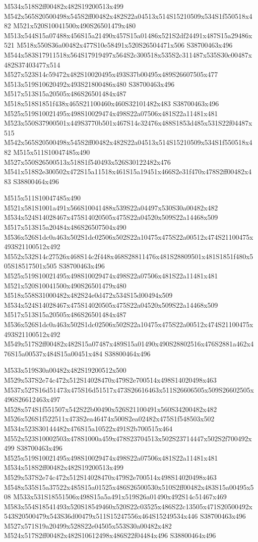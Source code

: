 \documentclass{article}
\begin{document}
\begin{multicols}{2}
M534x518S2ff00482x482S19200513x499 M542x565S20500498x545S2ff00482x482S22a04513x514S15210509x534S1f550518x482 M521x520S10041500x490S26501479x480 M513x544S15a07488x456S15a21490x457S15a01486x521S2df24491x487S15a29486x521 M518x550S36a00482x477S10e58491x520S26504471x506 S38700463x496 M544x583S17911518x564S17919497x564S2c300518x535S2c311487x535S30c00487x482S37403477x514 M527x523S14c59472x482S10020495x493S37b00495x489S26607505x477 M513x519S10620492x493S21800486x480 S38700463x496 M517x513S15a20505x486S26501484x487 M518x518S1851f438x465S21100460x460S32101482x483 S38700463x496 M525x519S10021495x498S10029474x498S22a07506x481S22a11481x481 M523x550S37900501x449S3770b501x467S14c32476x488S1853d485x531S22f04487x515 M542x565S20500498x545S2ff00482x482S22a04513x514S15210509x534S1f550518x482 M515x511S10047485x490 M527x550S26500513x518S1f540493x526S30122482x476 M541x518S2e300502x472S15a11518x461S15a19451x466S2e31f470x478S2ff00482x483 S38800464x496

M515x511S10047485x490 M521x581S1001a491x566S10041488x539S22a04497x530S30a00482x482 M534x524S14028467x475S14020505x475S22a04520x509S22a14468x509 M517x513S15a20484x486S26507504x490 M536x526S1dc0a463x502S1dc02506x502S22a10475x475S22a00512x474S21100475x493S21100512x492 M552x532S14c27526x468S14c2f448x468S28811476x481S28809501x481S1851f480x505S18517501x505 S38700463x496 M525x519S10021495x498S10029474x498S22a07506x481S22a11481x481 M521x520S10041500x490S26501479x480 M518x558S31000482x482S24e0d472x534S15d00494x509 M534x524S14028467x475S14020505x475S22a04520x509S22a14468x509 M517x513S15a20505x486S26501484x487 M536x526S1dc0a463x502S1dc02506x502S22a10475x475S22a00512x474S21100475x493S21100512x492 M549x517S2ff00482x482S15a07487x489S15a01490x490S28802516x476S2881a462x476S15a00537x484S15a00451x484 S38800464x496

M533x519S30a00482x482S19200512x500 M529x537S2e74c472x512S14028470x479S2e700514x498S14020498x463 M537x527S16d51473x475S16d51517x473S26616463x511S26606505x509S26602505x496S26612463x497 M528x574S1f551507x542S22b00490x526S21100491x560S34200482x482 M526x526S1f522511x473S2ea46474x500S2ea02482x475S1f548503x502 M534x523S30144482x476S15a10522x491S2b700515x464 M552x523S10002503x478S1000a459x478S23704513x502S23714447x502S2f700492x499 S38700463x496 M525x519S10021495x498S10029474x498S22a07506x481S22a11481x481 M534x518S2ff00482x482S19200513x499 M529x537S2e74c472x512S14028470x479S2e700514x498S14020498x463 M548x535S15a37522x485S15a01525x486S26500530x510S2ff00482x483S15a00495x508 M533x531S18551506x498S15a5a491x519S26a01490x492S14c51467x469 M583x554S18541493x520S18549460x520S22c03525x486S22c13505x471S20500492x543S20500479x543S36d00479x511S15247556x464S15249534x446 S38700463x496 M527x571S19a20499x528S22e04505x553S30a00482x482 M524x517S2ff00482x482S10612498x486S22f04484x496 S38800464x496


\end{multicols}
\end{document}
